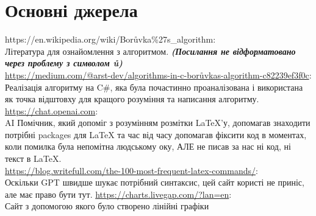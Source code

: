 \documentclass[titlepage, a4paper]{article}
\begin{document}
\section{Основні джерела}
https://en.wikipedia.org/wiki/Borůvka\%27s\_algorithm: \\
Література для ознайомлення з алгоритмом. \textbf{\textit{(Посилання не відформатовано через проблему з символом ů)}}\\
\url{https://medium.com/@arst-dev/algorithms-in-c-borůvkas-algorithm-c82239ef3f0c}: \\
Реалізація алгоритму на C\#, яка була почастинно проаналізована і використана як точка відштовху для кращого розуміння та написання алгоритму.\\
\url{https://chat.openai.com}:\\
 AI Помічник, який допоміг з розумінням розмітки LaTeX'у, допомагав знаходити потрібні packages для LaTeX та час від часу допомагав фіксити код в моментах, коли помилка була непомітна людському оку, АЛЕ не писав за нас ні код, ні текст в LaTeX.\\
\url{https://blog.writefull.com/the-100-most-frequent-latex-commands/}:\\
 Оскільки GPT швидше шукає потрібний синтаксис, цей сайт користі не приніс, але має право бути тут.
\url{https://charts.livegap.com/?lan=en}: \\
Сайт з допомогою якого було створено лінійні графіки
\end{document}
